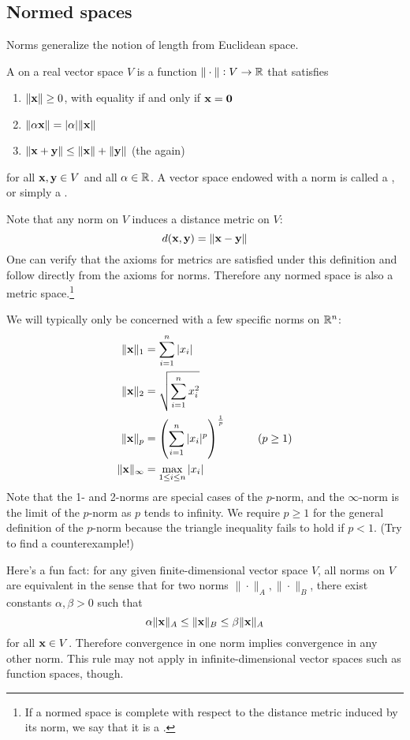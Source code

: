\subsection{Normed spaces}
Norms generalize the notion of length from Euclidean space.

A  on a real vector space $V$ is a function $\|\cdot\| : V \to \mathbb{R}$ that satisfies
\begin{enumerate}
\item $\|\mathbf{x}\| \geq 0$, with equality if and only if $\mathbf{x} = \mathbf{0}$
\item $\|\alpha\mathbf{x}\| = |\alpha|\|\mathbf{x}\|$
\item $\|\mathbf{x}+\mathbf{y}\| \leq \|\mathbf{x}\| + \|\mathbf{y}\|$ (the  again)
\end{enumerate}
for all $\mathbf{x}, \mathbf{y} \in V$ and all $\alpha \in \mathbb{R}$.
A vector space endowed with a norm is called a , or simply a .

Note that any norm on $V$ induces a distance metric on $V$:
\[d(\mathbf{x}, \mathbf{y}) = \|\mathbf{x}-\mathbf{y}\|\]
One can verify that the axioms for metrics are satisfied under this definition and follow directly from the axioms for norms.
Therefore any normed space is also a metric space.\footnote{
    If a normed space is complete with respect to the distance metric induced by its norm, we say that it is a .
}

We will typically only be concerned with a few specific norms on $\mathbb{R}^n$:
\begin{align*}
\|\x\|_1 &= \sum_{i=1}^n |x_i| \\
\|\x\|_2 &= \sqrt{\sum_{i=1}^n x_i^2} \\
\|\x\|_p &= \left(\sum_{i=1}^n |x_i|^p\right)^\frac{1}{p} \tab\tab (p \geq 1) \\
\|\x\|_\infty &= \max_{1 \leq i \leq n} |x_i|
\end{align*}
Note that the 1- and 2-norms are special cases of the $p$-norm, and the $\infty$-norm is the limit of the $p$-norm as $p$ tends to infinity.
We require $p \geq 1$ for the general definition of the $p$-norm because the triangle inequality fails to hold if $p < 1$.
(Try to find a counterexample!)

Here's a fun fact: for any given finite-dimensional vector space $V$, all norms on $V$ are equivalent in the sense that for two norms $\|\cdot\|_A, \|\cdot\|_B$, there exist constants $\alpha, \beta > 0$ such that
\[\alpha\|\mathbf{x}\|_A \leq \|\mathbf{x}\|_B \leq \beta\|\mathbf{x}\|_A\]
for all $\mathbf{x} \in V$. Therefore convergence in one norm implies convergence in any other norm.
This rule may not apply in infinite-dimensional vector spaces such as function spaces, though.

